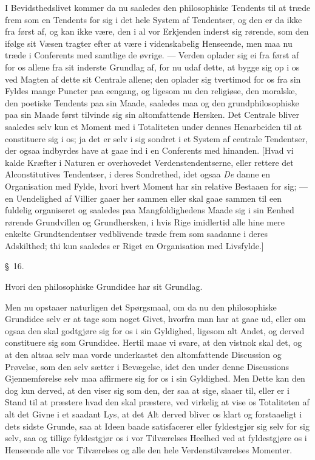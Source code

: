\documentclass[12pt,a4paper]{book}
\newcommand{\apage}[1]{\marginnote{\footnotesize\textit{[#1]}}}
\begin{document}
{\small I Bevidsthedslivet kommer da nu saaledes den philosophiske Tendents til at
træde frem som en Tendents for sig i det hele System af Tendentser, og den er da
ikke fra først af, og kan ikke være, den i al vor Erkjenden inderst sig rørende, som
den ifølge sit Væsen tragter efter at være i videnskabelig Henseende, men maa nu
træde i Conferents med samtlige de øvrige. --- Verden oplader sig ei fra først af for
os allene fra sit inderste Grundlag af, for nu udaf dette, at bygge sig op i os ved
Magten af dette sit Centrale allene; den oplader sig tvertimod for os fra sin Fyldes
mange Puncter paa eengang, og ligesom nu den religiøse, den moralske, den poetiske
Tendents paa sin Maade, saaledes maa og den grundphilosophiske paa sin Maade først
tilvinde sig sin altomfattende Hersken. Det Centrale bliver saaledes selv kun et
Moment med i Totaliteten under dennes Henarbeiden til at constituere sig i os; ja det
er selv i sig sondret i et System af centrale Tendentser, der ogsaa indbyrdes have
at gaae ind i en Conferents med hinanden. [Hvad vi kalde Kræfter i Naturen er
overhovedet Verdenstendentserne, eller rettere det Alconstitutives Tendentser, i
deres Sondrethed, idet ogsaa \emph{De} danne en Organisation med Fylde, hvori hvert
Moment har sin relative Bestaaen for sig; --- en Uendelighed af Villier gaaer her
sammen eller skal gaae sammen til een fuldelig organiseret og saaledes paa
Mangfoldighedens Maade sig i sin Eenhed rørende Grundvillen og Grundhersken, i hvis
Rige imidlertid alle hine mere enkelte Grundtendentser vedblivende træde frem som
saadanne i deres Adskilthed; thi kun saaledes er Riget en Organisation med
Livsfylde.]\par}

\begin{center}\large\S~16.\end{center}
\begin{center}Hvori den philosophiske Grundidee har sit Grundlag.\end{center}

Men nu opstaaer naturligen det Spørgsmaal, om da nu den philosophiske Grundidee selv
er at tage som noget Givet, hvorfra man har at gaae ud, eller om ogsaa den skal
godtgjøre sig for os i sin Gyldighed, ligesom alt Andet, og derved constituere sig
som Grundidee. Hertil maae vi svare, at den vistnok skal det, og at den altsaa selv
maa vorde underkastet den altomfattende Discussion og Prøvelse, som den selv sætter
i Bevægelse, idet den under denne Discussions Gjennemførelse selv maa affirmere sig
for os i sin Gyldighed. Men Dette kan den dog kun derved, at den viser sig som den,
der saa at sige, slaaer til, eller er i Stand til at præstere hvad den skal
præstere, ved virkelig at vise os Totaliteten af alt det Givne i et saadant Lys, at
det Alt derved bliver os klart og forstaaeligt i  \apage{64} dets sidste Grunde, saa at Ideen
baade satisfacerer eller fyldestgjør sig selv for sig selv, saa og tillige
fyldestgjør os i vor Tilværelses Heelhed ved at fyldestgjøre os i Henseende alle vor
Tilværelses og alle den hele Verdenstilværelses Momenter.
\end{document}
